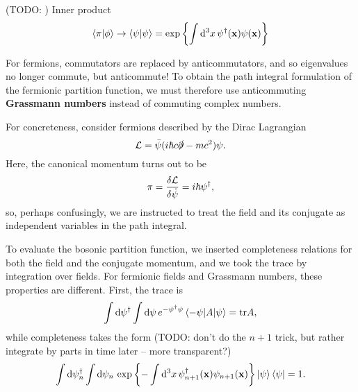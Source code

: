 
(TODO: )
Inner product
\begin{equation}
	\braket{\pi | \phi} \rightarrow \braket{\psi | \psi} = \exp \left\{ \int \mathop{}\!\mathrm{d}^3 x \, \psi^\dagger(\mathbf{x}) \psi(\mathbf{x}) \right\}
\end{equation}

For fermions, commutators are replaced by anticommutators, and so eigenvalues no longer commute, but anticommute!
To obtain the path integral formulation of the fermionic partition function, we must therefore use anticommuting \textbf{Grassmann numbers} instead of commuting complex numbers.

For concreteness, consider fermions described by the Dirac Lagrangian
\begin{equation}
	\mathcal{L} = \bar{\psi} (i \hbar c \slashed\partial - m c^2) \psi .
\end{equation}
Here, the canonical momentum turns out to be
\begin{equation}
	\pi = \fdv{\lagr}{\dot\psi} = i \hbar \psi^\dagger ,
\end{equation}
so, perhaps confusingly, we are instructed to treat the field and its conjugate as independent variables in the path integral.

To evaluate the bosonic partition function, we inserted completeness relations for both the field and the conjugate momentum, and we took the trace by integration over fields.
For fermionic fields and Grassmann numbers, these properties are different.
First, the trace is
\begin{equation}
	\int \mathop{}\!\mathrm{d} \psi^\dagger \int \mathop{}\!\mathrm{d} \psi \, e^{-\psi^\dagger \psi} \braket{-\psi | A | \psi} = \text{tr} A ,
\label{eq:tft:trace_grassmann}
\end{equation}
while completeness takes the form
(TODO: don't do the $n+1$ trick, but rather integrate by parts in time later -- more transparent?)
\begin{equation}
	\int \mathop{}\!\mathrm{d} \psi_n^\dagger \int \mathop{}\!\mathrm{d} \psi_n \, \exp \left\{-\int \mathop{}\!\mathrm{d}^3 x \, \psi_{n+1}^\dagger(\mathbf{x}) \psi_{n+1}(\mathbf{x}) \right\} \ket{\psi} \bra{\psi} = 1 .
\label{eq:tft:completeness_grassmann}
\end{equation}

